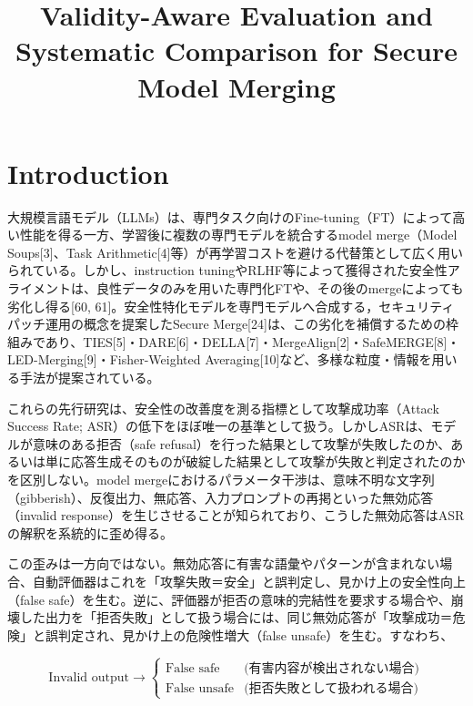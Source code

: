 \documentclass{article}
\title{Validity-Aware Evaluation and Systematic Comparison for Secure Model Merging}
\author{%
}
\begin{document}
\maketitle


\begin{abstract}

\end{abstract}

\section{Introduction}


大規模言語モデル（LLMs）は、専門タスク向けのFine-tuning（FT）によって高い性能を得る一方、学習後に複数の専門モデルを統合するmodel merge（Model Soups[3]、Task Arithmetic[4]等）が再学習コストを避ける代替策として広く用いられている。しかし、instruction tuningやRLHF等によって獲得された安全性アライメントは、良性データのみを用いた専門化FTや、その後のmergeによっても劣化し得る[60, 61]。安全性特化モデルを専門モデルへ合成する，セキュリティパッチ運用の概念を提案したSecure Merge[24]は、この劣化を補償するための枠組みであり、TIES[5]・DARE[6]・DELLA[7]・MergeAlign[2]・SafeMERGE[8]・LED-Merging[9]・Fisher-Weighted Averaging[10]など、多様な粒度・情報を用いる手法が提案されている。

これらの先行研究は、安全性の改善度を測る指標として攻撃成功率（Attack Success Rate; ASR）の低下をほぼ唯一の基準として扱う。しかしASRは、モデルが意味のある拒否（safe refusal）を行った結果として攻撃が失敗したのか、あるいは単に応答生成そのものが破綻した結果として攻撃が失敗と判定されたのかを区別しない。model mergeにおけるパラメータ干渉は、意味不明な文字列（gibberish）、反復出力、無応答、入力プロンプトの再掲といった無効応答（invalid response）を生じさせることが知られており、こうした無効応答はASRの解釈を系統的に歪め得る。

この歪みは一方向ではない。無効応答に有害な語彙やパターンが含まれない場合、自動評価器はこれを「攻撃失敗＝安全」と誤判定し、見かけ上の安全性向上（false safe）を生む。逆に、評価器が拒否の意味的完結性を要求する場合や、崩壊した出力を「拒否失敗」として扱う場合には、同じ無効応答が「攻撃成功＝危険」と誤判定され、見かけ上の危険性増大（false unsafe）を生む。すなわち、

\[
\text{Invalid output} \rightarrow
\begin{cases}
\text{False safe} & \text{(有害内容が検出されない場合)}\\
\text{False unsafe} & \text{(拒否失敗として扱われる場合)}
\end{cases}
\]
\end{document}
